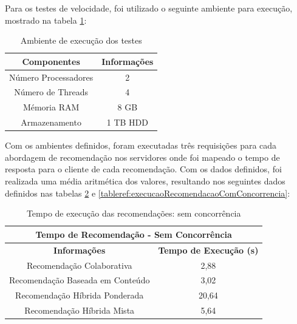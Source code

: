 Para os testes de velocidade, foi utilizado o seguinte ambiente para execução, mostrado na tabela \ref{tableref:ambienteTeste}:

\begin{table}[H]
\centering
\begin{tabular}{|c|c|}
\hline
\textbf{Componentes} & \textbf{Informações} \\ \hline
Número Processadores & 2                               \\ \hline
Número de Threads    & 4                               \\ \hline
Mémoria RAM          & 8 GB                            \\ \hline
Armazenamento        & 1 TB HDD                        \\ \hline
\end{tabular}
\caption{Ambiente de execução dos testes}
\label{tableref:ambienteTeste}
\end{table}

Com os ambientes definidos, foram executadas três requisições para cada abordagem de recomendação nos servidores onde foi mapeado o tempo de resposta para o cliente de cada recomendação. Com os dados definidos, foi realizada uma média aritmética dos valores, resultando nos seguintes dados definidos nas tabelas \ref{tableref:execucaoRecomendacaoSemConcorrencia} e \ref{tableref:execucaoRecomendacaoComConcorrencia}:

\begin{table}[H]
\centering
\begin{tabular}{|c|c|}
\hline
\multicolumn{2}{|c|}{\textbf{Tempo de Recomendação - Sem Concorrência}} \\ \hline
\textbf{Informações}                 & \textbf{Tempo de Execução (s)}    \\ \hline
Recomendação Colaborativa            & 2,88                               \\ \hline
Recomendação Baseada em Conteúdo     & 3,02                               \\ \hline
Recomendação Híbrida Ponderada       & 20,64                              \\ \hline
Recomendação Híbrida Mista           & 5,64                               \\ \hline
\end{tabular}
\caption{Tempo de execução das recomendações: sem concorrência}
\label{tableref:execucaoRecomendacaoSemConcorrencia}
\end{table}

